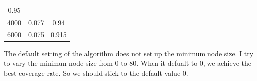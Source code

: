 \documentclass[]{article}
\begin{document}
\begin{longtable}[]{@{}ccc@{}}
\begin{minipage}[t]{0.13\columnwidth}
0.95\strut
\end{minipage}\tabularnewline
\begin{minipage}[t]{0.09\columnwidth}\centering\strut
4000\strut
\end{minipage} & \begin{minipage}[t]{0.10\columnwidth}\centering\strut
0.077\strut
\end{minipage} & \begin{minipage}[t]{0.13\columnwidth}\centering\strut
0.94\strut
\end{minipage}\tabularnewline
\begin{minipage}[t]{0.09\columnwidth}\centering\strut
6000\strut
\end{minipage} & \begin{minipage}[t]{0.10\columnwidth}\centering\strut
0.075\strut
\end{minipage} & \begin{minipage}[t]{0.13\columnwidth}\centering\strut
0.915\strut
\end{minipage}\tabularnewline
\bottomrule
\end{longtable}

The default setting of the algorithm does not set up the minimum node
size. I try to vary the minimun node size from 0 to 80. When it defualt
to 0, we achieve the best coverage rate. So we should stick to the
default value 0.
\end{document}
